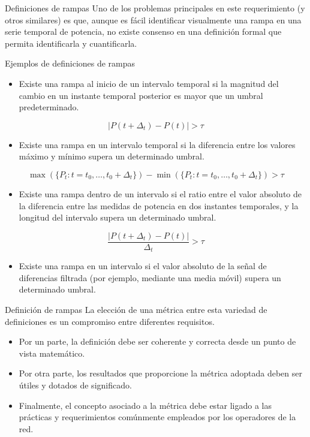 \documentclass[aspectratio=169, usenames,svgnames,dvipsnames]{beamer}
\begin{document}
\begin{frame}[label={sec:org1e086f4}]{Definiciones de rampas}
Uno de los problemas principales en este requerimiento (y otros similares) es que, aunque es fácil identificar visualmente una rampa en una serie temporal de potencia, no existe consenso en una definición formal que permita identificarla y cuantificarla.
\end{frame}

\begin{frame}[label={sec:org00907ab}]{Ejemplos de definiciones de rampas}
\begin{itemize}
\item Existe una rampa al inicio de un intervalo temporal si la magnitud del cambio en un instante temporal posterior es mayor que un umbral predeterminado.
\end{itemize}
\[ 
\left| P(t +\Delta_t) - P(t)\right| > \tau
\]

\begin{itemize}
\item Existe una rampa en un intervalo temporal si la diferencia entre los
valores máximo y mínimo supera un determinado umbral.
\end{itemize}
\[
\max(\{P_t: t = t_0, \dots, t_0+\Delta_t\}) - \min(\{P_t: t=t_0,
\dots, t_0+\Delta_t\}) > \tau
\]

\begin{itemize}
\item Existe una rampa dentro de un intervalo si el ratio entre el valor absoluto de la diferencia entre las medidas de potencia en dos instantes temporales, y la longitud del intervalo supera un determinado umbral.
\end{itemize}
\[
\frac{\left|P(t + \Delta_t) - P(t)\right|}{\Delta_t} > \tau
\]

\begin{itemize}
\item Existe una rampa en un intervalo si el valor absoluto de la señal de diferencias filtrada (por ejemplo, mediante una media móvil) supera un determinado umbral.
\end{itemize}
\end{frame}

\begin{frame}[label={sec:org8de00e7}]{Definición de rampas}
La elección de una métrica entre esta variedad de definiciones es un
\alert{compromiso} entre diferentes requisitos.

\begin{itemize}
\item Por un parte, la definición debe ser \alert{coherente y correcta desde un
punto de vista matemático}.
\item Por otra parte, los resultados que proporcione la métrica adoptada
deben ser \alert{útiles y dotados de significado}.
\item Finalmente, el concepto asociado a la métrica debe estar ligado a
las \alert{prácticas y requerimientos comúnmente empleados por los
operadores de la red}.
\end{itemize}
\end{frame}
\end{document}

